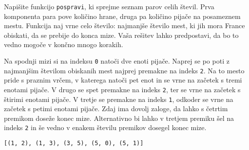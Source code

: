 \documentclass[arhiv]{../izpit}
\begin{document}
Napišite funkcijo \verb|pospravi|, ki sprejme seznam parov celih števil. 
Prva komponenta para pove količino hrane, druga pa količino pijače na posameznem mestu. Funkcija naj vrne celo število: najmanjše število mest, ki jih mora France obiskati, 
da se prebije do konca mize. 
Vaša rešitev lahko predpostavi, da bo to vedno mogoče v končno mnogo korakih.

Na spodnji mizi si na indeksu \verb|0| natoči dve enoti pijače.
Naprej se po poti z najmanjšim številom obiskanih mest najprej premakne na indeks \verb|2|.
Na to mesto pride s praznim vrčem, v katerega natoči pet enot in se vrne na začetek s tremi enotami pijače. 
V drugo se spet premakne na indeks \verb|2|, ter se vrne na začetek s štirimi enotami pijače.
V tretje se premakne na indeks \verb|1|, odkoder se vrne na začetek s petimi enotami pijače.
Zdaj ima dovolj zaloge, da lahko s četrtim premikom doseže konec mize.
Alternativno bi lahko v tretjem premiku šel na indeks \verb|2| in še vedno v enakem številu premikov dosegel konec mize.


\verb|[(1, 2), (1, 3), (3, 5), (5, 0), (5, 1)]|
\end{document}
